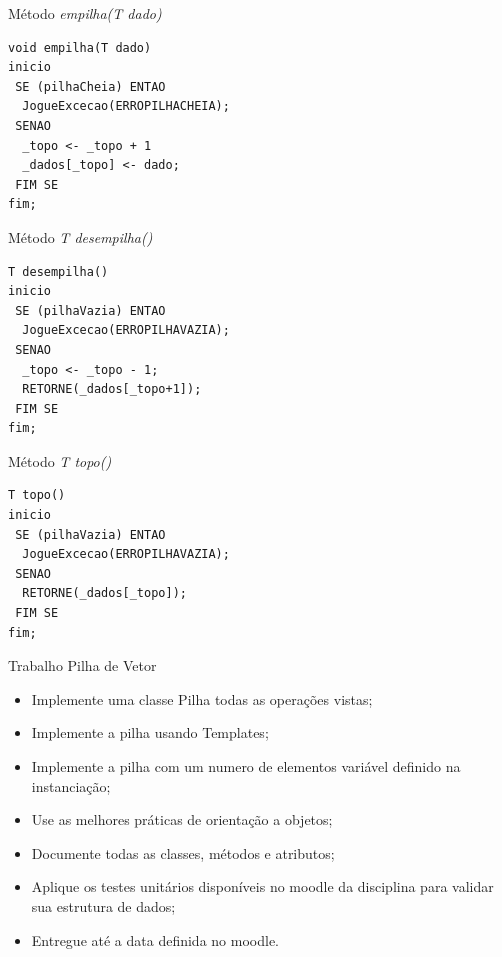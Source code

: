 \documentclass[12pt,table,xcolor={dvipsnames}]{beamer}
\begin{document}
\begin{frame}[fragile]{Método \textit{empilha(T dado)}}
\begin{lstlisting}
void empilha(T dado)
inicio
 SE (pilhaCheia) ENTAO
  JogueExcecao(ERROPILHACHEIA);
 SENAO
  _topo <- _topo + 1
  _dados[_topo] <- dado;
 FIM SE
fim;
\end{lstlisting}
\end{frame}

\begin{frame}[fragile]{Método \textit{T desempilha()}}
\begin{lstlisting}
T desempilha()
inicio
 SE (pilhaVazia) ENTAO
  JogueExcecao(ERROPILHAVAZIA);
 SENAO
  _topo <- _topo - 1;
  RETORNE(_dados[_topo+1]);
 FIM SE
fim;
\end{lstlisting}
\end{frame}

\begin{frame}[fragile]{Método \textit{T topo()}}
\begin{lstlisting}
T topo()
inicio
 SE (pilhaVazia) ENTAO
  JogueExcecao(ERROPILHAVAZIA);
 SENAO
  RETORNE(_dados[_topo]);
 FIM SE
fim;
\end{lstlisting}
\end{frame}

\begin{frame}[fragile]{Trabalho Pilha de Vetor}
\begin{itemize}
\item Implemente uma classe Pilha todas as operações vistas;
\item Implemente a pilha usando Templates;
\item Implemente a pilha com um numero de elementos variável definido na instanciação;
\item Use as melhores práticas de orientação a objetos;
\item Documente todas as classes, métodos e atributos;
\item Aplique os testes unitários disponíveis no moodle da disciplina para validar sua estrutura de dados;
\item Entregue até a data definida no moodle.
\end{itemize}
\end{frame}
\end{document}
